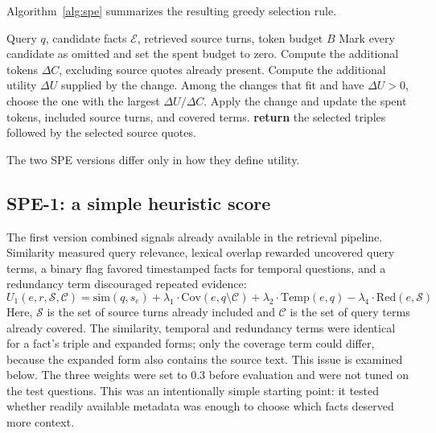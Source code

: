 Algorithm~\ref{alg:spe} summarizes the resulting greedy selection rule.

\begin{algorithm}[htbp]
\caption{Selective provenance expansion using a greedy density rule}
\label{alg:spe}
\small
\begin{algorithmic}[1]
\REQUIRE Query $q$, candidate facts $\mathcal{E}$, retrieved source turns, token budget $B$
\STATE Mark every candidate as omitted and set the spent budget to zero.
    \STATE Compute the additional tokens $\Delta C$, excluding source quotes already present.
    \STATE Compute the additional utility $\Delta U$ supplied by the change.
  \ENDFOR
  \STATE Among the changes that fit and have $\Delta U > 0$, choose the one with the largest $\Delta U/\Delta C$.
  \STATE Apply the change and update the spent tokens, included source turns, and covered terms.
\ENDWHILE
\STATE \textbf{return} the selected triples followed by the selected source quotes.
\end{algorithmic}
\end{algorithm}

The two SPE versions differ only in how they define utility.

\subsection{SPE-1: a simple heuristic score}
The first version combined signals already available in the retrieval pipeline. Similarity measured
query relevance, lexical overlap rewarded uncovered query terms, a binary flag favored timestamped
facts for temporal questions, and a redundancy term discouraged repeated evidence:
\begin{equation}
  U_1(e, r, \mathcal{S}, \mathcal{C}) = \text{sim}(q, s_e) + \lambda_1 \cdot \text{Cov}(e, q \setminus \mathcal{C}) + \lambda_2 \cdot \text{Temp}(e, q) - \lambda_4 \cdot \text{Red}(e, \mathcal{S})
\end{equation}
Here, $\mathcal{S}$ is the set of source turns already included and $\mathcal{C}$ is the set of query
terms already covered. The similarity, temporal and redundancy terms were identical for a fact's triple
and expanded forms; only the coverage term could differ, because the expanded form also contains the
source text. This issue is examined below.
The three weights were set to 0.3 before evaluation and were not tuned on the test questions. This was
an intentionally simple starting point: it tested whether readily available metadata was enough to
choose which facts deserved more context.

